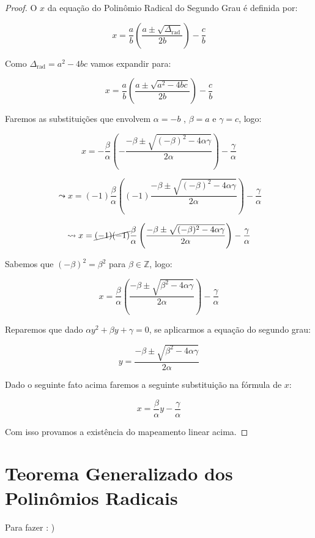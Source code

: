 \documentclass{article}
\begin{document}
\begin{proof}
O $x$ da equação do Polinômio Radical do Segundo Grau é definida por:

\[
x = \frac{a}{b}\left(\frac{a \pm \sqrt{\Delta_{\text{rad}}}}{2b}\right)- \frac{c}{b}
\]

Como $\Delta_{\text{rad}}= a^2-4bc$ vamos expandir para:

\[
x = \frac{a}{b}\left(\frac{a \pm \sqrt{a^2-4bc}}{2b}\right)- \frac{c}{b}
\]

Faremos as substituições que envolvem $\alpha = -b$ , $\beta = a$ e $\gamma = c$, logo:

\[
x = -\frac{\beta}{\alpha}\left(-\frac{-\beta \pm \sqrt{(-\beta)^2-4\alpha \gamma}}{2\alpha}\right)- \frac{\gamma}{\alpha}
\]

\[
\leadsto 
x = (-1)\frac{\beta}{\alpha}\left((-1)\frac{-\beta \pm \sqrt{(-\beta)^2-4\alpha \gamma}}{2\alpha}\right)- \frac{\gamma}{\alpha}
\]

\[
\leadsto 
x = \cancel{(-1)(-1)}\frac{\beta}{\alpha}\left(\frac{-\beta \pm \sqrt{(-\beta)^2-4\alpha \gamma}}{2\alpha}\right)- \frac{\gamma}{\alpha}
\]

Sabemos que $(-\beta)^2=\beta^2$ para $\beta \in \mathbb{Z}$, logo:

\[
x = \frac{\beta}{\alpha}\left(\frac{-\beta \pm \sqrt{\beta^2-4\alpha \gamma}}{2\alpha}\right)- \frac{\gamma}{\alpha}
\]

Reparemos que dado $\alpha y^2 + \beta y + \gamma = 0$, se aplicarmos a equação do segundo grau:

\[
y = \frac{-\beta \pm \sqrt{\beta^2-4\alpha \gamma}}{2\alpha}
\]

Dado o seguinte fato acima faremos a seguinte substituição na fórmula de $x$:

\[
x = \frac{\beta}{\alpha}y- \frac{\gamma}{\alpha}
\]

Com isso provamos a existência do mapeamento linear acima.
\end{proof}

\section{Teorema Generalizado dos Polinômios Radicais}

Para fazer : )
\end{document}
